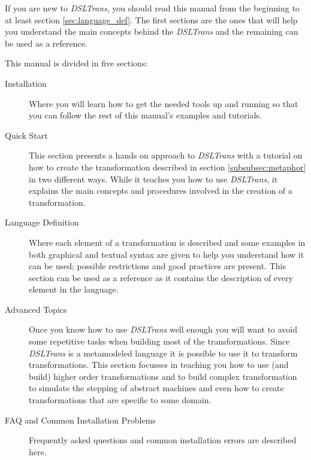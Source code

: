 If you are new to \emph{DSLTrans}, you should read
this manual from the beginning to at least section \ref{sec:language_def}. The
first sections are the ones that will help you understand the main concepts
behind the \emph{DSLTrans} and the remaining can be used as a reference.

This manual is divided in five sections:

\begin{description}
  \item[Installation] Where you will learn how to get the needed
  tools up and running so that you can follow the rest of this manual's examples
  and tutorials.
  \item[Quick Start] This section presents a hands on approach to
  \emph{DSLTrans} with a tutorial on how to create the transformation described
  in section \ref{subsubsec:metaphor} in two different ways. While it teaches
  you how to use \emph{DSLTrans}, it explains the main concepts and procedures
  involved in the creation of a transformation.
  \item[Language Definition] Where each element of a transformation is described
  and some examples in both graphical and textual syntax are given to help you
  understand how it can be used; possible restrictions and good practices are
  present. This section can be used as a reference as it contains the
  description of every element in the language.
  \item[Advanced Topics] Once you know how to use \emph{DSLTrans} well enough
  you will want to avoid some repetitive tasks when building most of the
  transformations. Since \emph{DSLTrans} is a metamodeled language it is
  possible to use it to transform transformations. This section focusses in
  teaching you how to use (and build) higher order transformations and to build
  complex transformation to simulate the stepping of abstract machines and even
  how to create transformations that are specific to some domain.
  \item[FAQ and Common Installation Problems] Frequently asked questions and common installation errors are
  described here.
\end{description}

\clearpage